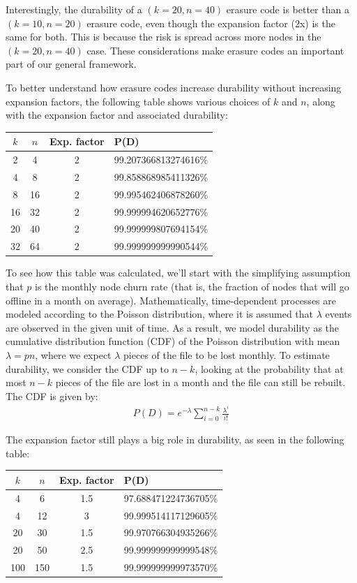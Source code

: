 \documentclass[8pt,fleqn,openany]{book}
\begin{document}
Interestingly, the durability of a $(k=20,n=40)$ erasure code
is better than a $(k=10,n=20)$ erasure code, even though the expansion factor
(2x) is the same for both. This is because the risk is spread
across more nodes in the $(k=20,n=40)$ case. These considerations make erasure
codes an important part of our general framework.

To better understand how erasure codes increase durability without
increasing expansion factors, the following table shows various choices of
$k$ and $n$, along with the expansion factor and associated durability:

\begin{center}
\begin{tabular}{c c c l}
$k$ & $n$ & Exp. factor & P(D) \\ \hline
2 & 4 & 2 & 99.207366813274616\%\\
4 & 8 & 2 & 99.858868985411326\%\\
8 & 16 & 2 & 99.995462406878260\%\\
16 & 32 & 2 & 99.999994620652776\%\\
20 & 40 & 2 & 99.999999807694154\%\\
32 & 64 & 2 & 99.999999999990544\%\\
\end{tabular}
\end{center}

To see how this table was calculated, we'll start
with the simplifying assumption that $p$ is the monthly node
churn rate (that is, the fraction of nodes that will go offline in a month on
average). Mathematically, time-dependent processes are modeled according to
the Poisson distribution, where it is assumed that $\lambda$ events are
observed in the given unit of time.
As a result, we model durability
as the cumulative distribution function (CDF) of the Poisson distribution with mean $\lambda=pn$,
where we expect $\lambda$ pieces of the file to be lost monthly.
To estimate
durability, we consider the CDF up to $n-k$,
looking at the probability that at most $n-k$ pieces
of the file are lost in a month and the file can still be rebuilt.
The CDF is given by:
\begin{align*}
 && P(D) = e^{-\lambda} \sum_{i=0}^{n-k} \frac{\lambda^i}{i!} &&
\end{align*}

The expansion factor still plays a big role in durability, as seen in the
following table:

\begin{center}
\begin{tabular}{c c c l}
$k$ & $n$ & Exp. factor & P(D) \\ \hline
4 & 6 & 1.5 & 97.688471224736705\%\\
4 & 12 & 3 & 99.999514117129605\%\\
20 & 30 & 1.5 & 99.970766304935266\%\\
20 & 50 & 2.5 & 99.999999999999548\%\\
100 & 150 & 1.5 & 99.999999999973570\%\\
\end{tabular}
\end{center}
\end{document}
